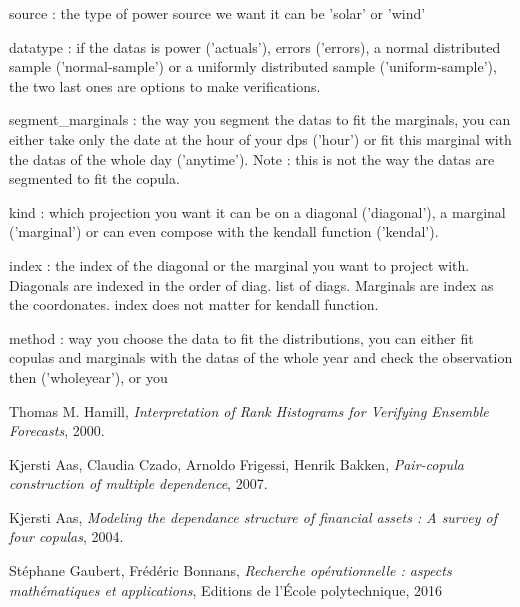 \documentclass{article}
\begin{document}
\begin{itemize}
	source : the type of power source we want it can be 'solar' or 'wind'\newline
	
	datatype : if the datas is power ('actuals'), errors ('errors), a normal distributed sample ('normal-sample') or a uniformly distributed sample ('uniform-sample'), the two last ones are options to make verifications. \newline
	
	segment_marginals : the way you segment the datas to fit the marginals, you can either take only the date at the hour of your dps ('hour') or fit this marginal with the datas of the whole day ('anytime'). Note : this is not the way the datas are segmented to fit the copula.
	
	kind : which projection you want it can be on a diagonal ('diagonal'), a marginal ('marginal') or can even compose with the kendall function ('kendal'). \newline
	
	index : the index of the diagonal or the marginal you want to project with. Diagonals are indexed in the order of diag. list of diags. Marginals are index as the coordonates. index does not matter for kendall function.\newline
	
	method : way you choose the data to fit the distributions, you can either fit copulas and marginals with the datas of the whole year and check the observation then ('wholeyear'), or you 
	
	
	

\end{itemize}
	
	   
   
   
   
   \begin{thebibliography}{9}

  	Thomas M. Hamill,
 	 \emph{Interpretation of Rank Histograms for Verifying Ensemble Forecasts},
  	2000.

  	Kjersti Aas, Claudia Czado, Arnoldo Frigessi, Henrik Bakken,
 	 \emph{Pair-copula construction of multiple dependence},
  	2007.
  	
  	Kjersti Aas,
 	 \emph{Modeling the dependance structure of financial assets : A survey of four copulas},
  	2004.
  	
  	Stéphane Gaubert, Frédéric Bonnans,
  	\emph{Recherche opérationnelle : aspects mathématiques et applications},
  	Editions de l'École polytechnique,
  	2016

	\end{thebibliography}
\end{document}
